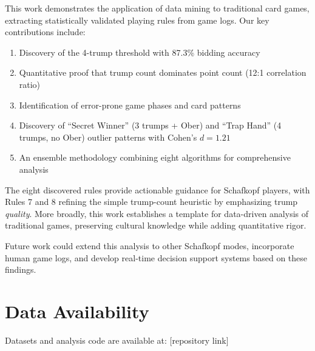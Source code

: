 \documentclass[conference]{IEEEtran}
\begin{document}
This work demonstrates the application of data mining to traditional card games, extracting statistically validated playing rules from game logs. Our key contributions include:

\begin{enumerate}
    \item Discovery of the 4-trump threshold with 87.3\% bidding accuracy
    \item Quantitative proof that trump count dominates point count (12:1 correlation ratio)
    \item Identification of error-prone game phases and card patterns
    \item Discovery of ``Secret Winner'' (3 trumps + Ober) and ``Trap Hand'' (4 trumps, no Ober) outlier patterns with Cohen's $d = 1.21$
    \item An ensemble methodology combining eight algorithms for comprehensive analysis
\end{enumerate}

The eight discovered rules provide actionable guidance for Schafkopf players, with Rules 7 and 8 refining the simple trump-count heuristic by emphasizing trump \textit{quality}. More broadly, this work establishes a template for data-driven analysis of traditional games, preserving cultural knowledge while adding quantitative rigor.

Future work could extend this analysis to other Schafkopf modes, incorporate human game logs, and develop real-time decision support systems based on these findings.

\section*{Data Availability}

Datasets and analysis code are available at: [repository link]
\end{document}
